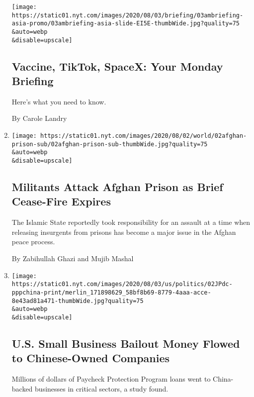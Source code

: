\begin{enumerate}
  \texttt{[image: https://static01.nyt.com/images/2020/08/03/briefing/03ambriefing-asia-promo/03ambriefing-asia-slide-EI5E-thumbWide.jpg?quality=75\\\&auto=webp\\\&disable=upscale]}

  \hypertarget{vaccine-tiktok-spacex-your-monday-briefing}{%
  \subsection{Vaccine, TikTok, SpaceX: Your Monday
  Briefing}\label{vaccine-tiktok-spacex-your-monday-briefing}}

  Here's what you need to know.

  By Carole Landry
\item
  \href{/2020/08/02/world/asia/afghan-prison-attack-prisoners.html}{}

  \texttt{[image: https://static01.nyt.com/images/2020/08/02/world/02afghan-prison-sub/02afghan-prison-sub-thumbWide.jpg?quality=75\\\&auto=webp\\\&disable=upscale]}

  \hypertarget{militants-attack-afghan-prison-as-brief-cease-fire-expires}{%
  \subsection{Militants Attack Afghan Prison as Brief Cease-Fire
  Expires}\label{militants-attack-afghan-prison-as-brief-cease-fire-expires}}

  The Islamic State reportedly took responsibility for an assault at a
  time when releasing insurgents from prisons has become a major issue
  in the Afghan peace process.

  By Zabihullah Ghazi and Mujib Mashal
\item
  \href{/2020/08/02/us/politics/virus-china-ppp-small-business-loans.html}{}

  \texttt{[image: https://static01.nyt.com/images/2020/08/03/us/politics/02JPdc-pppchina-print/merlin\_171898629\_58bf8b69-8779-4aaa-acce-8e43ad81a471-thumbWide.jpg?quality=75\\\&auto=webp\\\&disable=upscale]}

  \hypertarget{us-small-business-bailout-money-flowed-to-chinese-owned-companies}{%
  \subsection{U.S. Small Business Bailout Money Flowed to Chinese-Owned
  Companies}\label{us-small-business-bailout-money-flowed-to-chinese-owned-companies}}

  Millions of dollars of Paycheck Protection Program loans went to
  China-backed businesses in critical sectors, a study found.


\end{enumerate}
